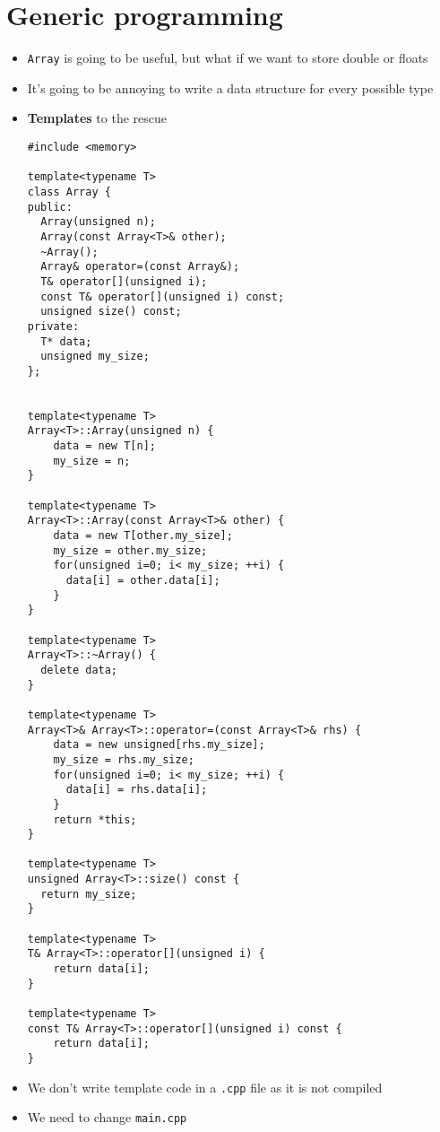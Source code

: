 \documentclass[11pt]{article}
\begin{document}
\section{Generic programming}
\label{sec:org1701b89}
\begin{itemize}
\item \texttt{Array} is going to be useful, but what if we want to store double or floats
\item It's going to be annoying to write a data structure for every possible type
\item \textbf{Templates} to the rescue
\begin{verbatim}
#include <memory>

template<typename T>
class Array {
public:
  Array(unsigned n);
  Array(const Array<T>& other);
  ~Array();
  Array& operator=(const Array&);
  T& operator[](unsigned i);
  const T& operator[](unsigned i) const;
  unsigned size() const;
private:
  T* data;
  unsigned my_size;
};


template<typename T>
Array<T>::Array(unsigned n) {
    data = new T[n];
    my_size = n;
}

template<typename T>
Array<T>::Array(const Array<T>& other) {
    data = new T[other.my_size];
    my_size = other.my_size;
    for(unsigned i=0; i< my_size; ++i) {
      data[i] = other.data[i];
    }
}

template<typename T>
Array<T>::~Array() {
  delete data;
}

template<typename T>
Array<T>& Array<T>::operator=(const Array<T>& rhs) {
    data = new unsigned[rhs.my_size];
    my_size = rhs.my_size;
    for(unsigned i=0; i< my_size; ++i) {
      data[i] = rhs.data[i];
    }
    return *this;
}

template<typename T>
unsigned Array<T>::size() const {
  return my_size;
}

template<typename T>
T& Array<T>::operator[](unsigned i) {
    return data[i];
}

template<typename T>
const T& Array<T>::operator[](unsigned i) const {
    return data[i];
}
\end{verbatim}
\item We don't write template code in a \texttt{.cpp} file as it is not compiled
\item We need to change \texttt{main.cpp}
\end{itemize}
\end{document}

